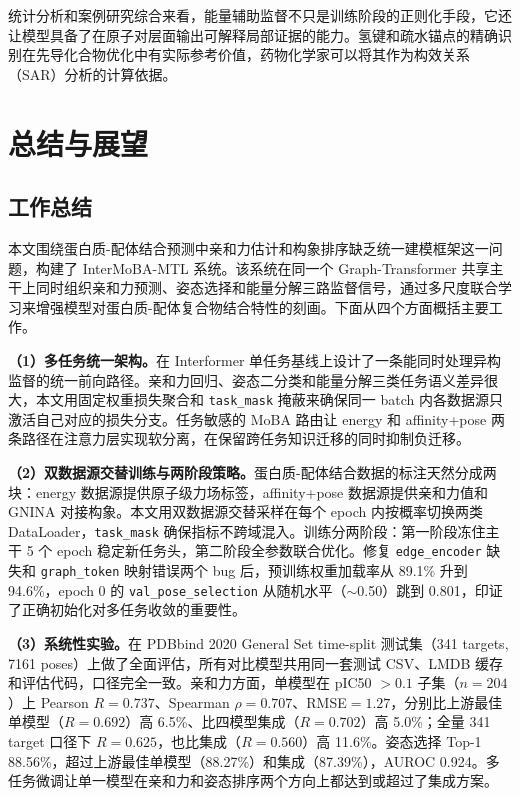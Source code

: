 统计分析和案例研究综合来看，能量辅助监督不只是训练阶段的正则化手段，它还让模型具备了在原子对层面输出可解释局部证据的能力。氢键和疏水锚点的精确识别在先导化合物优化中有实际参考价值，药物化学家可以将其作为构效关系（SAR）分析的计算依据。

\newpage

\section{总结与展望}
\subsection{工作总结}

本文围绕蛋白质-配体结合预测中亲和力估计和构象排序缺乏统一建模框架这一问题，构建了 InterMoBA-MTL 系统\cite{lai2024interformer}。该系统在同一个 Graph-Transformer 共享主干上同时组织亲和力预测、姿态选择和能量分解三路监督信号，通过多尺度联合学习来增强模型对蛋白质-配体复合物结合特性的刻画。下面从四个方面概括主要工作。

\textbf{（1）多任务统一架构。}在 Interformer 单任务基线上设计了一条能同时处理异构监督的统一前向路径。亲和力回归、姿态二分类和能量分解三类任务语义差异很大，本文用固定权重损失聚合和 \texttt{task\_mask} 掩蔽来确保同一 batch 内各数据源只激活自己对应的损失分支。任务敏感的 MoBA 路由\cite{lu2025moba}让 energy 和 affinity+pose 两条路径在注意力层实现软分离，在保留跨任务知识迁移的同时抑制负迁移。

\textbf{（2）双数据源交替训练与两阶段策略。}蛋白质-配体结合数据的标注天然分成两块：energy 数据源提供原子级力场标签，affinity+pose 数据源提供亲和力值和 GNINA 对接构象。本文用双数据源交替采样在每个 epoch 内按概率切换两类 DataLoader，\texttt{task\_mask} 确保指标不跨域混入。训练分两阶段：第一阶段冻住主干 5 个 epoch 稳定新任务头，第二阶段全参数联合优化。修复 \texttt{edge\_encoder} 缺失和 \texttt{graph\_token} 映射错误两个 bug 后，预训练权重加载率从 89.1\% 升到 94.6\%，epoch 0 的 \texttt{val\_pose\_selection} 从随机水平（$\sim$0.50）跳到 0.801，印证了正确初始化对多任务收敛的重要性。

\textbf{（3）系统性实验。}在 PDBbind 2020 General Set time-split 测试集（341 targets, 7161 poses）上做了全面评估，所有对比模型共用同一套测试 CSV、LMDB 缓存和评估代码，口径完全一致。亲和力方面，单模型在 pIC50 $> 0.1$ 子集（$n=204$）上 Pearson $R=0.737$、Spearman $\rho=0.707$、RMSE$=1.27$，分别比上游最佳单模型（$R=0.692$）高 6.5\%、比四模型集成（$R=0.702$）高 5.0\%；全量 341 target 口径下 $R=0.625$，也比集成（$R=0.560$）高 11.6\%。姿态选择 Top-1 88.56\%，超过上游最佳单模型（88.27\%）和集成（87.39\%），AUROC 0.924。多任务微调让单一模型在亲和力和姿态排序两个方向上都达到或超过了集成方案。

